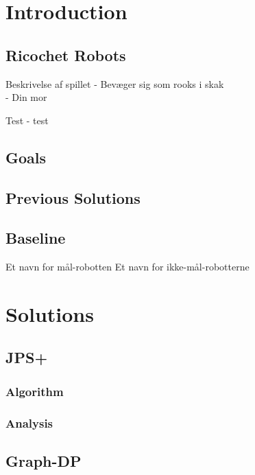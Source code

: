 \section{Introduction}\label{introduction}

\subsection{Ricochet Robots}\label{ricochet-robots}

Beskrivelse af spillet - Bevæger sig som rooks i skak\\
- Din mor

Test - test

\subsection{Goals}\label{goals}

\subsection{Previous Solutions}\label{previous-solutions}

\subsection{Baseline}\label{baseline}

Et navn for mål-robotten Et navn for ikke-mål-robotterne

\section{Solutions}\label{solutions}

\subsection{JPS+}\label{jps}

\subsubsection{Algorithm}\label{algorithm}

\subsubsection{Analysis}\label{analysis}

\subsection{Graph-DP}\label{graph-dp}

